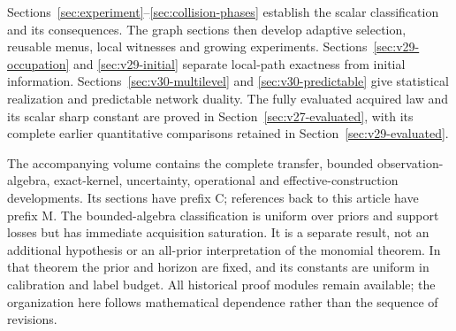Sections~\ref{sec:experiment}--\ref{sec:collision-phases} establish
the scalar classification and its consequences. The graph sections
then develop adaptive selection, reusable menus, local witnesses and
growing experiments. Sections~\ref{sec:v29-occupation} and
\ref{sec:v29-initial} separate local-path exactness from initial
information. Sections~\ref{sec:v30-multilevel} and
\ref{sec:v30-predictable} give statistical realization and predictable
network duality. The fully evaluated acquired law and its scalar
sharp constant are proved in Section~\ref{sec:v27-evaluated}, with
its complete earlier quantitative comparisons retained in
Section~\ref{sec:v29-evaluated}.

The accompanying volume contains the complete transfer, bounded
observation-algebra, exact-kernel, uncertainty, operational and
effective-construction developments. Its sections have prefix C;
references back to this article have prefix M. The bounded-algebra
classification is uniform over priors and support losses but has
immediate acquisition saturation. It is a separate result, not an
additional hypothesis or an all-prior interpretation of the monomial
theorem. In that theorem the prior and horizon are fixed, and its
constants are uniform in calibration and label budget. All historical
proof modules remain available; the organization here follows
mathematical dependence rather than the sequence of revisions.



